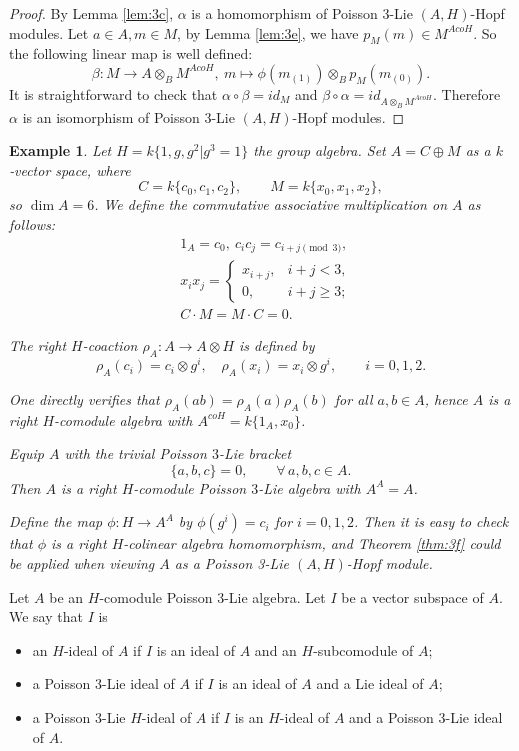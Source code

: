 \documentclass[11pt]{article}
\newtheorem{example}[theorem]{Example}
\def\ot{\otimes}
\begin{document}
\begin{proof}
By Lemma \ref{lem:3c}, $\alpha$ is a homomorphism of Poisson 3-Lie $(A,H)$-Hopf modules. Let $a\in A,m\in M$, by Lemma \ref{lem:3e}, we have $p_M(m)\in M^{AcoH}$. So the following linear map is well defined:
$$\beta:M\rightarrow A\ot_B M^{AcoH},\ m\mapsto\phi(m_{(1)})\ot_B p_M(m_{(0)}).$$
It is straightforward to check that $\alpha\circ\beta=id_{M}$ and $\beta\circ\alpha=id_{A\ot_BM^{AcoH}}$. Therefore $\alpha$ is an isomorphism of Poisson 3-Lie $(A,H)$-Hopf modules.
\end{proof}

\begin{example}\label{ex:finite-dimensional-comodule-poisson3lie}
Let $H=k\{1,g,g^2|g^3=1\}$ the group algebra. 
Set $A=C\oplus M$ as a $k$‑vector space, where
\[
C=k\{c_0,c_1,c_2\},\qquad M=k\{x_0,x_1,x_2\},
\]
so $\dim A=6$. We define the commutative associative multiplication on $A$ as follows:
\begin{align*}
&1_A=c_0,\ c_ic_j=c_{i+j\pmod 3},\\
&x_ix_j=\begin{cases}
x_{i+j}, & i+j<3,\\
0, & i+j\ge 3;
\end{cases}\\
&C\cdot M=M\cdot C=0.
\end{align*}

The right $H$-coaction $\rho_A\colon A\to A\otimes H$ is defined by
\[
\rho_A(c_i)=c_i\otimes g^i,\quad \rho_A(x_i)=x_i\otimes g^i,\qquad i=0,1,2.
\]

One directly verifies that $\rho_A(ab)=\rho_A(a)\rho_A(b)$ for all $a,b\in A$, hence $A$ is a right $H$-comodule algebra with $A^{coH}=k\{1_A,x_0\}$.

Equip $A$ with the trivial Poisson $3$-Lie bracket
\[
\{a,b,c\}=0,\qquad \forall\,a,b,c\in A.
\]
Then $A$ is a right $H$-comodule Poisson $3$-Lie algebra with $A^A=A$.

Define the map $\phi\colon H\to A^A$ by $\phi(g^i)=c_i$ for $i=0,1,2$. Then it is easy to check that $\phi$ is a right $H$-colinear algebra homomorphism, and Theorem \ref{thm:3f} could be applied when viewing $A$ as a Poisson 3-Lie $(A,H)$-Hopf module.
\end{example}


Let $A$ be an $H$-comodule Poisson 3-Lie algebra. Let $I$ be a vector subspace of $A$. We say that $I$ is
\begin{itemize}
    \item[(i)] an $H$-ideal of $A$ if $I$ is an ideal of $A$ and an $H$-subcomodule of $A$;
    \item[(ii)] a Poisson 3-Lie ideal of $A$ if $I$ is an ideal of $A$ and a Lie ideal of $A$;
    \item[(iii)] a Poisson 3-Lie $H$-ideal of $A$ if $I$ is an $H$-ideal of $A$ and a Poisson 3-Lie ideal of $A$.
\end{itemize}
\end{document}

